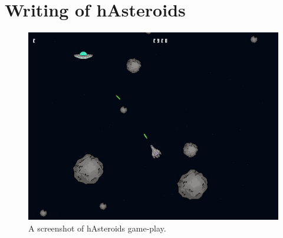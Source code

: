 \documentclass[
  digital, %
  color,   %
  table,   %
  oneside, %
  lof,     %
  lot,     %
]{fithesis3}
\begin{document}
\section{Writing of hAsteroids}
\begin{figure}[hbt!]
    \centering
    \includegraphics[width=\textwidth]{images/hasteroids-screenshot.jpg}
    \caption{A screenshot of hAsteroids game-play.}
    \label{fig:hasteroidsscreenshot}
\end{figure}
\end{document}
